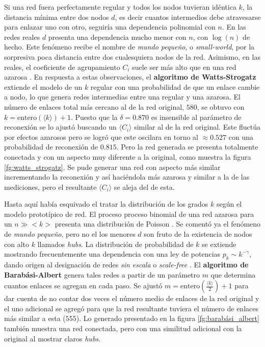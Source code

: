 \documentclass{article}
\begin{document}
Si una red fuera perfectamente regular y todos los nodos tuvieran idéntica $k$, la distancia mínima entre dos nodos $d$, es decir cuantos intermedios debe atravesarse para enlazar uno con otro, seguiría una dependencia polinomial con $n$.
En las redes reales $d$ presenta una dependencia mucho menor con $n$, con $\log(n)$ de hecho.
Este fenómeno recibe el nombre de \emph{mundo pequeño}, o \emph{small-world}, por la sorpresiva poca distancia entre dos cualesquiera nodos de la red.
Asimismo, en las reales, el coeficiente de agrupamiento $C_i$ suele ser más alto que en una red azarosa \cite[sección 3.9]{albert-laszlo_barabasi_network_2016}. 
En respuesta a estas observaciones, el \textbf{algoritmo de Watts-Strogatz} extiende el modelo de un $k$ regular con una probabilidad de que un enlace cambie a nodo, lo que genera redes intermedias entre una regular y una azarosa.
El número de enlaces total más cercano al de la red original, $580$, se obtuvo con $k = \mathrm{entero}(\langle k \rangle) + 1$. 
Puesto que la $\delta = 0.870$ es insensible al parámetro de reconexión se lo ajustó buscando un $\langle C_i \rangle$ similar al de la red original.
Este fluctúa por efectos azarosos pero se logró que este oscilara en torno al $\approx 0.527$ con una probabilidad de reconexión de $0.815$.
Pero la red generada se presenta totalmente conectada y con un aspecto muy diferente a la original, como muestra la figura \ref{fg:watts_strogatz}. 
Se pude generar una red con aspecto más similar incrementando la reconexión y así haciéndola más azarosa y similar a la de las mediciones, pero el resultante $\langle C_i \rangle$ se aleja del de esta.

Hasta aquí había esquivado el tratar la distribución de los grados $k$ según el modelo prototípico de red.
El proceso proceso binomial de una red azarosa para un $n \gg <k>$ presenta una distribución de Poisson \cite[sección 3.4]{albert-laszlo_barabasi_network_2016}.
Se comentó ya el fenómeno de \emph{mundo pequeño}, pero no el los menores $d$ son fruto de la existencia de nodos con alto $k$ llamados \emph{hubs}.
La distribución de probabilidad de $k$ se extiende mostrando frecuentemente una dependencia con una ley de potencias $p_k \sim k^{- \gamma}$, dando origen al designación de redes \emph{sin escala} o \emph{scale-free} \cite*[sección 4.2]{albert-laszlo_barabasi_network_2016}.
El \textbf{algoritmo de Barabási-Albert} genera tales redes a partir de un parámetro $m$ que determina cuantos enlaces se agregan en cada paso.
Se ajustó $m = \mathrm{entero} \left( \frac{\langle k \rangle}{2} \right) + 1$ para dar cuenta de no contar dos veces el número medio de enlaces de la red original y el uno adicional se agregó para que la red resultante tuviera el número de enlaces más similar a esta ($555$).
Lo generado presentado en la figura \ref{fg:barabási_albert} también muestra una red conectada, pero con una similitud adicional con la original al mostrar claros \emph{hubs}.  
\end{document}
